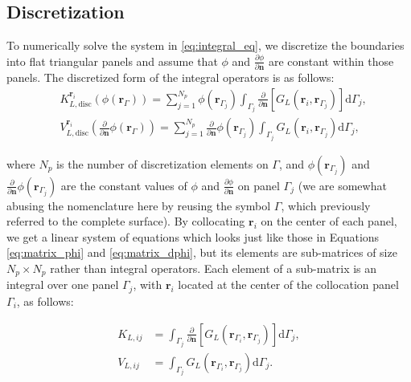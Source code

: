 

\subsection{Discretization}

To numerically solve the system in \eqref{eq:integral_eq}, we discretize the boundaries into flat triangular panels and assume that $\phi$ and $\frac{\partial \phi}{\partial \mathbf{n}}$ are constant within those panels. The discretized form of the integral operators is as follows:
%
\begin{align} \label{eq:layers_disc}
&K_{L,\text{disc}}^{\mathbf{r}_i}(\phi(\mathbf{r}_{\Gamma})) =  \sum_{j=1}^{N_p}\phi(\mathbf{r}_{\Gamma_j})\int_{\Gamma_j} \frac{\partial}{\partial \mathbf{n}} \left[ G_L(\mathbf{r}_{i},\mathbf{r}_{\Gamma_j}) \right]\mathrm{d} \Gamma_j,  \nonumber \\
&V_{L,\text{disc}}^{\mathbf{r}_i} \left( \frac{\partial}{\partial \mathbf{n}} \phi(\mathbf{r}_{\Gamma}) \right) = \sum_{j=1}^{N_p} \frac{\partial}{\partial \mathbf{n}} \phi(\mathbf{r}_{\Gamma_j}) \int_{\Gamma_j} G_L(\mathbf{r}_{i},\mathbf{r}_{\Gamma_j})  \mathrm{d} \Gamma_j,
\end{align}

\noindent where $N_p$ is the number of discretization elements on $\Gamma$, and $\phi(\mathbf{r}_{\Gamma_j})$ and $\frac{\partial}{\partial \mathbf{n}} \phi(\mathbf{r}_{\Gamma_j})$ are the constant values of $\phi$ and $\frac{\partial \phi}{\partial \mathbf{n}}$ on panel $\Gamma_j$ (we are somewhat abusing the nomenclature here by reusing the symbol $\Gamma$, which previously referred to the complete surface). By collocating $\mathbf{r}_i$ on the center of each panel, we get a linear system of equations which looks just like those in Equations \eqref{eq:matrix_phi} and  \eqref{eq:matrix_dphi}, but its elements are sub-matrices of size $N_p \times N_p$ rather than integral operators. Each element of a sub-matrix is an integral over one panel $\Gamma_j$, with $\mathbf{r}_i$ located at the center of the collocation panel $\Gamma_i$, as follows:

\begin{align} \label{eq:layers_element}
K_{L,ij} &= \int_{\Gamma_j} \frac{\partial}{\partial \mathbf{n}} \left[ G_L(\mathbf{r}_{\Gamma_i},\mathbf{r}_{\Gamma_j}) \right]\mathrm{d} \Gamma_j, \nonumber \\
V_{L,ij} &= \int_{\Gamma_j} G_L(\mathbf{r}_{\Gamma_i},\mathbf{r}_{\Gamma_j})  \mathrm{d} \Gamma_j.
\end{align}

